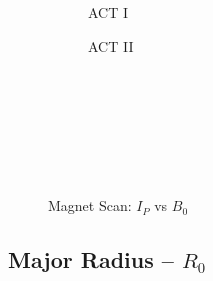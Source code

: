 \begin{figure*}[h!]
\begin{subfigure}[t]{0.45\textwidth}
\begin{adjustbox}{width=\textwidth}
      \Large
      
    \end{adjustbox}
        \caption{ACT I}
    \end{subfigure}
    \hfill
    \begin{subfigure}[t]{0.45\textwidth}
        \centering
    \begin{adjustbox}{width=\textwidth}
      \Large
      
    \end{adjustbox}
        \caption{ACT II}
    \end{subfigure}
    \hfill \hfill ~\\ ~\\ ~\\ ~\\
  \caption[]{Magnet Scan: $I_P$ vs $B_0$} ~\\
\end{figure*}


\clearpage

\newpage

\subsection*{ Major Radius -- $R_0$ }
  \label{subsection:scan_R_0}

